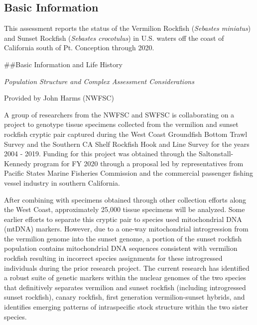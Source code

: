 \documentclass[11pt,
  english,
  a4paper,
]{article}
\begin{document}

\hypertarget{basic-information}{%
\subsection{Basic Information}\label{basic-information}}

\leavevmode\tagmcend\tagstructend

This assessment reports the status of the Vermilion Rockfish (\emph{Sebastes miniatus}) and Sunset Rockfish (\emph{Sebastes crocotulus}) in U.S. waters off the coast of California south of Pt. Conception through 2020.

\#\#Basic Information and Life History

\emph{Population Structure and Complex Assessment Considerations}

Provided by John Harms (NWFSC)

A group of researchers from the NWFSC and SWFSC is collaborating on a project to genotype tissue specimens collected from the vermilion and sunset rockfish cryptic pair captured during the West Coast Groundfish Bottom Trawl Survey and the Southern CA Shelf Rockfish Hook and Line Survey for the years 2004 - 2019. Funding for this project was obtained through the Saltonstall-Kennedy program for FY 2020 through a proposal led by representatives from Pacific States Marine Fisheries Commission and the commercial passenger fishing vessel industry in southern California.

After combining with specimens obtained through other collection efforts along the West Coast, approximately 25,000 tissue specimens will be analyzed. Some earlier efforts to separate this cryptic pair to species used mitochondrial DNA (mtDNA) markers. However, due to a one-way mitochondrial introgression from the vermilion genome into the sunset genome, a portion of the sunset rockfish population contains mitochondrial DNA sequences consistent with vermilion rockfish resulting in incorrect species assignments for these introgressed individuals during the prior research project. The current research has identified a robust suite of genetic markers within the nuclear genomes of the two species that definitively separates vermilion and sunset rockfish (including introgressed sunset rockfish), canary rockfish, first generation vermilion-sunset hybrids, and identifies emerging patterns of intraspecific stock structure within the two sister species.
\end{document}
